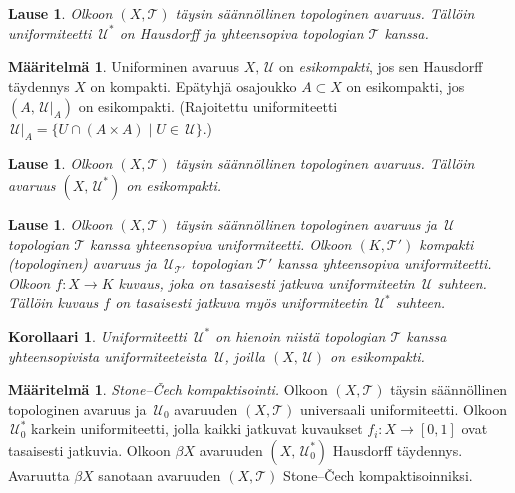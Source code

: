 \documentclass[12pt,a4paper,leqno]{report}
\newcommand{\U}{\,\mathcal{U}}
\newcommand{\T}{\mathcal{T}}
\theoremstyle{plain}
\newtheorem{lause}[equation]{Lause}
\newtheorem{kor}[equation]{Korollaari}
\theoremstyle{definition}
\newtheorem{maar}[equation]{Määritelmä}
\theoremstyle{remark}
\begin{document}
\begin{lause}
Olkoon $(X,\T)$ täysin säännöllinen topologinen avaruus. 
Tällöin uniformiteetti $\U^*$ on Hausdorff ja yhteensopiva topologian $\T$ kanssa. 
\end{lause}

\begin{maar}
Uniforminen avaruus $X,\U$ on \emph{esikompakti}, 
jos sen Hausdorff täydennys %
$\hat{X}$ on kompakti. 
Epätyhjä osajoukko $A\subset X$ on esikompakti, jos $(A,\U\vert _A)$ on esikompakti. 
(Rajoitettu uniformiteetti $\U\vert _A=\{U\cap (A\times A)\mid U\in\U\}$.)
\end{maar}

\begin{lause}
Olkoon $(X,\T)$ täysin säännöllinen topologinen avaruus. 
Tällöin avaruus $(X,\U^*)$ on esikompakti.
\end{lause}

\begin{lause}
Olkoon $(X,\T)$ täysin säännöllinen topologinen avaruus 
ja $\U$ topologian $\T$ kanssa yhteensopiva uniformiteetti. 
Olkoon $(K,\T')$ kompakti (topologinen) avaruus ja 
$\U_{\T'}$ topologian $\T'$ kanssa yhteensopiva uniformiteetti. 
Olkoon $f\colon X\rightarrow K$ kuvaus, joka on tasaisesti jatkuva uniformiteetin $\U$ suhteen. 
Tällöin kuvaus $f$ on tasaisesti jatkuva myös uniformiteetin $\U^*$ suhteen. 
\end{lause}

\begin{kor}
Uniformiteetti $\U^*$ on hienoin niistä topologian $\T$ 
kanssa yhteensopivista uniformiteeteista $\U$, 
joilla $(X,\U)$ on esikompakti. 
\end{kor}

\begin{maar}
\emph{Stone–Čech kompaktisointi.}
Olkoon $(X,\T)$ täysin säännöllinen topologinen avaruus ja 
$\U_0$ avaruuden $(X,\T)$ universaali uniformiteetti. 
Olkoon $\U^{*}_{0}$ karkein uniformiteetti, 
jolla kaikki jatkuvat kuvaukset $f_i\colon X\rightarrow [0,1]$ 
ovat tasaisesti jatkuvia. 
Olkoon $\beta X$ avaruuden $(X,\U^{*}_{0})$ Hausdorff täydennys.
Avaruutta $\beta X$ sanotaan avaruuden $(X,\T)$ 
Stone–Čech kompaktisoinniksi.
\end{maar}
\end{document}
